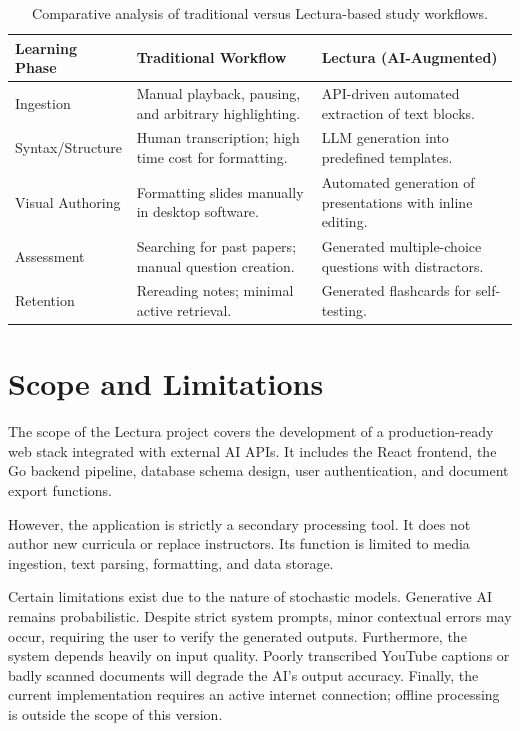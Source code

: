 \begin{table}[htbp]
\centering
\begin{tabular}{|l|p{5cm}|p{5cm}|}
\hline
\textbf{Learning Phase} & \textbf{Traditional Workflow} & \textbf{Lectura (AI-Augmented)} \\ \hline
Ingestion & Manual playback, pausing, and arbitrary highlighting. & API-driven automated extraction of text blocks. \\ \hline
Syntax/Structure & Human transcription; high time cost for formatting. & LLM generation into predefined templates. \\ \hline
Visual Authoring & Formatting slides manually in desktop software. & Automated generation of presentations with inline editing. \\ \hline
Assessment & Searching for past papers; manual question creation. & Generated multiple-choice questions with distractors. \\ \hline
Retention & Rereading notes; minimal active retrieval. & Generated flashcards for self-testing. \\ \hline
\end{tabular}
\vspace{6pt}
\caption{Comparative analysis of traditional versus Lectura-based study workflows.}
\label{tab:workflow_comparison}
\end{table}

\section{Scope and Limitations}
The scope of the Lectura project covers the development of a production-ready web stack integrated with external AI APIs. It includes the React frontend, the Go backend pipeline, database schema design, user authentication, and document export functions.

However, the application is strictly a secondary processing tool. It does not author new curricula or replace instructors. Its function is limited to media ingestion, text parsing, formatting, and data storage. 

Certain limitations exist due to the nature of stochastic models. Generative AI remains probabilistic. Despite strict system prompts, minor contextual errors may occur, requiring the user to verify the generated outputs. Furthermore, the system depends heavily on input quality. Poorly transcribed YouTube captions or badly scanned documents will degrade the AI's output accuracy. Finally, the current implementation requires an active internet connection; offline processing is outside the scope of this version.

